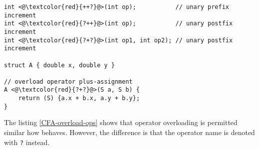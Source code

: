\begin{frame}
\frametitle{}
\begin{lstlisting}[caption={Overloading operators in \CFA},
label={CFA-overload-ops}]
int <@\textcolor{red}{++?}@>(int op);           // unary prefix increment
int <@\textcolor{red}{?++}@>(int op);           // unary postfix increment
int <@\textcolor{red}{?+?}@>(int op1, int op2); // unary postfix increment

struct A { double x, double y }

// overload operator plus-assignment
A <@\textcolor{red}{?+?}@>(S a, S b) {
    return (S) {a.x + b.x, a.y + b.y};
}
\end{lstlisting}
\end{frame}

The listing \ref{CFA-overload-ops} shows that operator overloading is permitted
similar how \CCS behaves. However, the difference is that the operator name is
denoted with \verb|?| instead.
